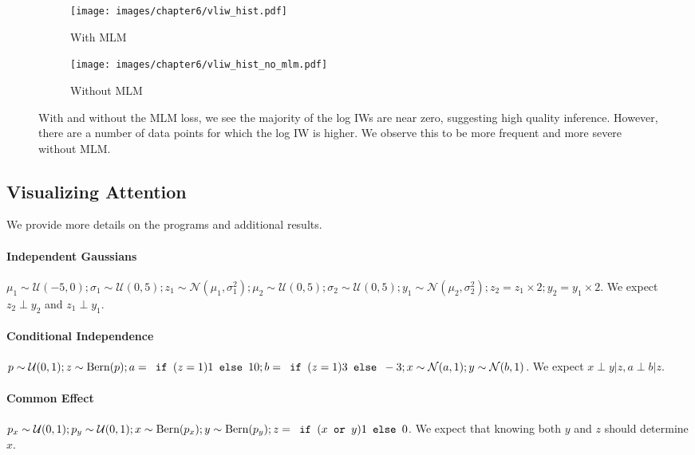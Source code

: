 \begin{figure}[h!]
  \centering
  \begin{subfigure}[b]{0.49\textwidth}
    \centering
    \texttt{[image: images/chapter6/vliw\_hist.pdf]}
    \caption{With MLM}
  \end{subfigure}
  \hfill
  \begin{subfigure}[b]{0.49\textwidth}
    \centering
    \texttt{[image: images/chapter6/vliw\_hist\_no\_mlm.pdf]}
    \caption{Without MLM}
  \end{subfigure}
  \hfill
\caption{With and without the MLM loss, we see the majority of the log IWs are near zero, suggesting high quality inference. However, there are a number of data points for which the log IW is higher. We observe this to be more frequent and more severe without MLM.}
\label{fig:vliw}
\end{figure}

\subsection{Visualizing Attention}
\label{sec:app:viz}

We provide more details on the programs and additional results.

\paragraph{Independent Gaussians} $\mu_1 \sim \mathcal{U}(-5, 0); \sigma_1 \sim \mathcal{U}(0, 5); z_1 \sim \mathcal{N}(\mu_1, \sigma^2_1); \mu_2 \sim \mathcal{U}(0, 5); \sigma_2 \sim \mathcal{U}(0, 5); y_1\sim \mathcal{N}(\mu_2, \sigma^2_2); z_2 = z_1 \times 2; y_2 = y_1 \times 2$. We expect $z_2 \perp y_2$ and $z_1 \perp y_1$.

\paragraph{Conditional Independence} $p \sim \mathcal{U}(0, 1); z \sim \textup{Bern}(p); a = \texttt{ if }(z = 1) 1 \texttt{ else } 10; b = \texttt{ if }(z = 1) 3 \texttt{ else } -3; x \sim \mathcal{N}(a, 1); y \sim \mathcal{N}(b, 1)$. We expect $x \perp y | z, a \perp b | z$.

\paragraph{Common Effect} $p_x \sim \mathcal{U}(0, 1); p_y \sim \mathcal{U}(0, 1); x \sim \textup{Bern}(p_x); y \sim \textup{Bern}(p_y); z = \texttt{ if }(x \texttt{ or } y) 1 \texttt{ else } 0$. We expect that knowing both $y$ and $z$ should determine $x$.


